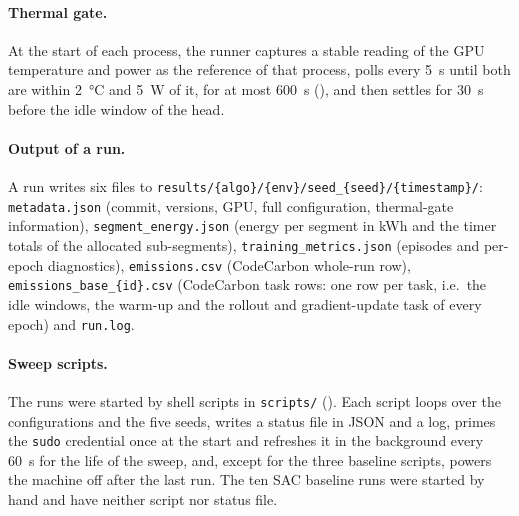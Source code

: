 \paragraph{Thermal gate.} At the start of each process, the runner captures a stable reading of the GPU temperature and power as the reference of that process, polls every \SI{5}{\second} until both are within \SI{2}{\celsius} and \SI{5}{\watt} of it, for at most \SI{600}{\second} (), and then settles for \SI{30}{\second} before the idle window of the head.

\paragraph{Output of a run.} A run writes six files to \texttt{results/\{algo\}/\{env\}/seed\_\allowbreak \{seed\}/\{timestamp\}/}: \texttt{metadata.json} (commit, versions, GPU, full configuration, thermal-gate information), \texttt{segment\_\allowbreak energy.json} (energy per segment in kWh and the timer totals of the allocated sub-segments), \texttt{training\_\allowbreak metrics.json} (episodes and per-epoch diagnostics), \texttt{emissions.csv} (CodeCarbon whole-run row), \texttt{emissions\_\allowbreak base\_\allowbreak \{id\}.csv} (CodeCarbon task rows: one row per task, i.e.\ the idle windows, the warm-up and the rollout and gradient-update task of every epoch) and \texttt{run.log}.

\paragraph{Sweep scripts.} The runs were started by shell scripts in \texttt{scripts/\allowbreak } ().
Each script loops over the configurations and the five seeds, writes a status file in JSON and a log, primes the \texttt{sudo} credential once at the start and refreshes it in the background every \SI{60}{\second} for the life of the sweep, and, except for the three baseline scripts, powers the machine off after the last run.
The ten SAC baseline runs were started by hand and have neither script nor status file.


